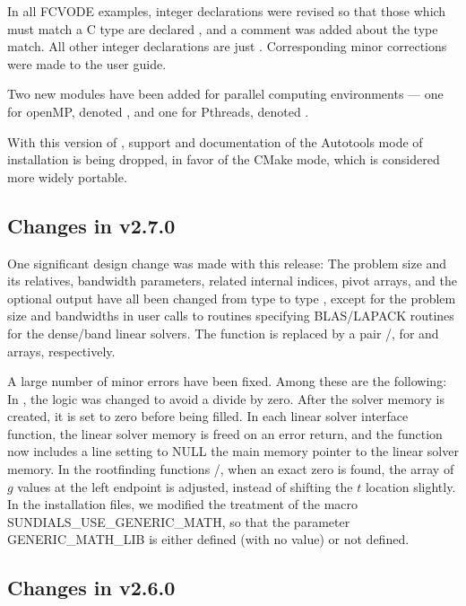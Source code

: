 In all FCVODE examples, integer declarations were revised so that
those which must match a C type  are declared ,
and a comment was added about the type match.  All other integer
declarations are just .  Corresponding minor corrections were
made to the user guide.

Two new {\nvector} modules have been added for parallel computing
environments --- one for openMP, denoted ,
and one for Pthreads, denoted .

With this version of {\sundials}, support and documentation of the
Autotools mode of installation is being dropped, in favor of the
CMake mode, which is considered more widely portable.

\subsection*{Changes in v2.7.0}

One significant design change was made with this release: The problem
size and its relatives, bandwidth parameters, related internal indices,
pivot arrays, and the optional output  have all been
changed from type  to type , except for the
problem size and bandwidths in user calls to routines specifying
BLAS/LAPACK routines for the dense/band linear solvers.  The function
 is replaced by a pair /,
for  and  arrays, respectively.

A large number of minor errors have been fixed.  Among these are the following:
In , the logic was changed to avoid a divide by zero.
After the solver memory is created, it is set to zero before being filled.
In each linear solver interface function, the linear solver memory is
freed on an error return, and the  function now includes a
line setting to NULL the main memory pointer to the linear solver memory.
In the rootfinding functions /, when an exact
zero is found, the array  of $g$ values at the left endpoint is
adjusted, instead of shifting the $t$ location  slightly.
In the installation files, we modified the treatment of the macro
SUNDIALS\_USE\_GENERIC\_MATH, so that the parameter GENERIC\_MATH\_LIB is
either defined (with no value) or not defined.

\subsection*{Changes in v2.6.0}

